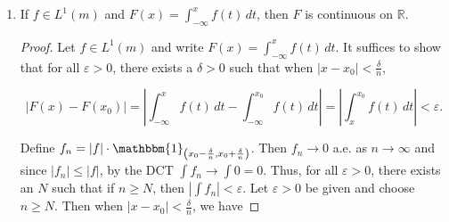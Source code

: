 \documentclass[11pt,oneside,english]{amsart}
\theoremstyle{definition}
\newcommand{\aspace}{\hspace{7mm}\text{and}\hspace{7mm}}
\newcommand{\lom}[2]{\lim_{{#1}\rightarrow{#2}}}
\newcommand{\R}{\mathbb{R}}
\newcommand{\ve}{\varepsilon}
\begin{document}
\begin{enumerate}
\begin{enumerate}
\begin{proof}
Since the $\limsup$ and $\liminf$ agree, the limit must exist, and we have 

\[
\lim_{\delta\rightarrow 0}\sup_{|y-x|\leq \delta}f(y)=\lim_{y\rightarrow x}f(y)=f(x)
\]

so $f$ is continuous. Conversely, suppose that $f$ is continuous at $x$. Then, by definition, 

\[
f(x)=\lom{y}{x}f(y)=\liminf_{y\rightarrow x}f(y)=\lim_{y\rightarrow x}\inf_{|x-y|\leq \delta}f(y)=\lim_{\delta\rightarrow 0}\inf_{|x-y|\leq \delta}f(y)=h(x),\text{ and}
\]

\[
f(x)=\lom{y}{x}f(y)=\limsup_{y\rightarrow x}f(y)=\lim_{y\rightarrow x}\sup_{|x-y|\leq \delta}f(y)=\lim_{\delta\rightarrow 0}\sup_{|x-y|\leq \delta}f(y)=H(x),
\]

so $H(x)=h(x)$.

\end{proof}


\item In the notation of the proof of Theorem 2.28a, $H=G$ a.e. and $h=g$ a.e. Hence $H$ and $h$ are Lebesgue measurable, and $\int_{[a,b]}H\,dm=\overline{I}_a^b(f)$ and $\int_{[a,b]}h\,dm=\uline{I}_a^b(f)$.

\begin{proof}
Recall that $G=\lim G_{P_k}$ where $\{P_k\}$ is a sequence of nested partitions and 

\[
G_{P_k}=\sum_{j=1}^nM_j\chi_{(t_{j-1},t_j]} \aspace  M_j=\sup_{y\in[t_{j-1},t_j]}f(y)
\]

Choose $k$ large enough that $|t_j-t_{j-1}|<\delta$, then 
\end{proof}

\end{enumerate}

\setcounter{enumi}{25}
\item If $f\in L^1(m)$ and $F(x)=\int_{-\infty}^xf(t)\,dt$, then $F$ is continuous on $\R$.

\begin{proof}
Let $f\in L^1(m)$ and write $F(x)=\int_{-\infty}^xf(t)\,dt$. It suffices to show that for all $\ve>0$, there exists a $\delta>0$ such that when $|x-x_0|<\frac{\delta}{n}$,

\[
|F(x)-F(x_0)|=\left|\int_{-\infty}^xf(t)\,dt-\int_{-\infty}^{x_0}f(t)\,dt\right|=\left|\int_x^{x_0}f(t)\,dt\right|<\ve.
\]

Define $f_n=|f|\cdot\mathbbm{1}_{\left(x_0-\frac{\delta}{n},x_0+\frac{\delta}{n}\right)}$. Then $f_n\rightarrow 0$ a.e. as $n\rightarrow \infty$ and since $|f_n|\leq|f|$, by the DCT $\int f_n\rightarrow\int 0=0$. Thus, for all $\ve>0$, there exists an $N$ such that if $n\geq N$, then $\left|\int f_n\right|<\ve$. Let $\ve>0$ be given and choose $n\geq N$. Then when $|x-x_0|<\frac{\delta}{n}$, we have


\end{proof}
\end{enumerate}
\end{document}
